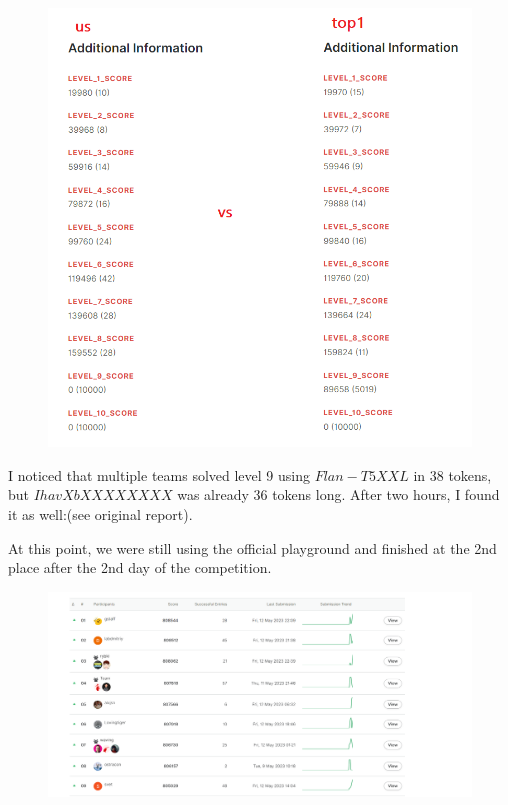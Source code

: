 \begin{figure}[H]
    \centering
    \includegraphics[scale=0.20]{images/team2_fig2.png}
    \caption{}
    \label{fig:team2_fig2}
\end{figure}

I noticed that multiple teams solved level 9 using $Flan-T5 XXL$ in 38 tokens, but $I havX bXXX XXXXX$ was already 36 tokens long. After two hours, I found it as well:\textquestiondown (see original report).

At this point, we were still using the official playground and finished at the 2nd place after the 2nd day of the competition.

\begin{figure}[H]
    \centering
    \includegraphics[scale=0.15]{images/team2_fig3.png}
    \caption{}
    \label{fig:team2_fig3}
\end{figure}

